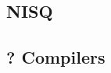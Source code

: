 \documentclass[11pt]{article}
\begin{document}
\subsection{NISQ}
\label{sec:orgd543e03}
\subsubsection{\cite{Preskill_2018}}
\label{sec:org26b9298}

\subsection{? Compilers}
\label{sec:org84eaeea}

\subsubsection{\cite{Fu_2016}}
\label{sec:org62e6417}
\end{document}
